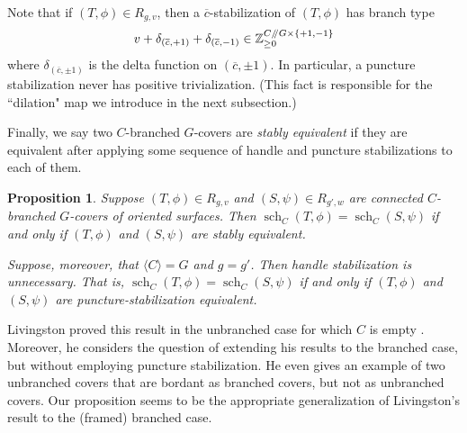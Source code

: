 \documentclass[10pt,twocolumn,amsmath,amssymb,aps,pra,secnumarabic,
    nofootinbib,groupedaddress]{revtex4-1}
\newtheorem{proposition}[theorem]{Proposition}
\newcommand{\Z}{\mathbb{Z}}
\newcommand{\sslash}{\mathbin{/\mkern-5mu/}}
\newcommand{\sch}{\operatorname{sch}}
\begin{document}
Note that if $(T,\phi) \in R_{g,v}$, then a $\overline{c}$-stabilization of $(T,\phi)$ has branch type
\[ v + \delta_{(\overline{c},+1)} + \delta_{(\overline{c},-1)} \in \Z_{\geq 0}^{C\sslash G \times \{+1,-1\} } \]
where $\delta_{(\overline{c},\pm 1)}$ is the delta function on $(\overline{c},\pm 1)$.  In particular, a puncture stabilization never has positive trivialization.  (This fact is responsible for the ``dilation" map we introduce in the next subsection.)

Finally, we say two $C$-branched $G$-covers are \emph{stably equivalent} if they are equivalent after applying some sequence of handle and puncture stabilizations to each of them.

\begin{proposition}
Suppose $(T,\phi) \in R_{g,v}$ and $(S,\psi) \in R_{g',w}$ are connected $C$-branched $G$-covers of oriented surfaces.  Then $\sch_C(T,\phi) = \sch_C(S,\psi)$ if and only if $(T,\phi)$ and $(S,\psi)$ are stably equivalent.  

Suppose, moreover, that $\langle C \rangle = G$ and $g=g'$.  Then handle stabilization is unnecessary.  That is, $\sch_C(T,\phi) = \sch_C(S,\psi)$ if and only if $(T,\phi)$ and $(S,\psi)$ are puncture-stabilization equivalent.
\label{p:stable}
\end{proposition}

Livingston proved this result in the unbranched case for which $C$ is empty \cite{Livingston:stabilizing}.  Moreover, he considers the question of extending his results to the branched case, but without employing puncture stabilization.  He even gives an example of two unbranched covers that are bordant as branched covers, but not as unbranched covers.  Our proposition seems to be the appropriate generalization of Livingston's result to the (framed) branched case.
\end{document}
